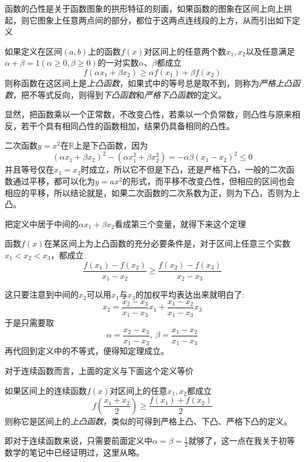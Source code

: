 函数的凸性是关于函数图象的拱形特征的刻画，如果函数的图象在区间上向上拱起，则它图象上任意两点间的部分，都位于这两点连线段的上方，从而引出如下定义
\begin{definition}
  如果定义在区间$(a,b)$上的函数$f(x)$对区间上的任意两个数$x_1,x_2$以及任意满足$\alpha+\beta=1(\alpha \geqslant 0,\beta \geqslant 0)$的一对实数$\alpha$、$\beta$都成立
  \[ f(\alpha x_1+\beta x_2) \geqslant \alpha f(x_1) + \beta f(x_2) \]
  则称函数在这区间上是\emph{上凸函数}，如果式中的等号总是取不到，则称为\emph{严格上凸函数}，把不等式反向，则得到\emph{下凸函数}和\emph{严格下凸函数}的定义。
\end{definition}

显然，把函数乘以一个正常数，不改变凸性，若乘以一个负常数，则凸性与原来相反，若干个具有相同凸性的函数相加，结果仍具备相同的凸性。

\begin{example}
  二次函数$y=x^2$在$\mathbb{R}$上是下凸函数，因为
  \[ (\alpha x_1 + \beta x_2)^2 - (\alpha x_1^2 + \beta x_2^2) = -\alpha \beta (x_1-x_2)^2 \leqslant 0 \]
  并且等号仅在$x_1=x_2$时成立，所以它不但是下凸，还是严格下凸，一般的二次函数通过平移，都可以化为$y=ax^2$的形式，而平移不改变凸性，但相应的区间也会相应的平移，所以结论就是，如果二次函数的二次系数为正，则为下凸，否则为上凸。
\end{example}

把定义中居于中间的$\alpha x_1 + \beta x_2$看成第三个变量，就得下来这个定理
\begin{theorem}
  \label{convert-function-tangent-of-secant-line}
  函数$f(x)$在某区间上为上凸函数的充分必要条件是，对于区间上任意三个实数$x_1<x_2<x_3$，都成立
  \[ \frac{f(x_1)-f(x_2)}{x_1-x_2} \geqslant \frac{f(x_2)-f(x_3)}{x_2-x_3} \]
\end{theorem}
这只要注意到中间的$x_2$可以用$x_1$与$x_3$的加权平均表达出来就明白了:
\[ x_2 = \frac{x_2-x_3}{x_1-x_3} x_1 + \frac{x_1-x_2}{x_1-x_3} x_3 \]
于是只需要取
\[ \alpha = \frac{x_2-x_3}{x_1-x_3}, \  \beta = \frac{x_1-x_2}{x_1-x_3} \]
再代回到定义中的不等式，便得知定理成立。

对于连续函数而言，上面的定义与下面这个定义等价
\begin{definition}
  如果区间上的连续函数$f(x)$对区间上的任意$x_1,x_2$都成立
  \[ f \left( \frac{x_1+x_2}{2} \right) \geqslant \frac{f(x_1)+f(x_2)}{2} \]
  则称它是区间上的\emph{上凸函数}，类似的可得到严格上凸、下凸、严格下凸的定义。
\end{definition}

即对于连续函数来说，只需要前面定义中$\alpha=\beta=\frac{1}{2}$就够了，这一点在我关于初等数学的笔记中已经证明过，这里从略。

